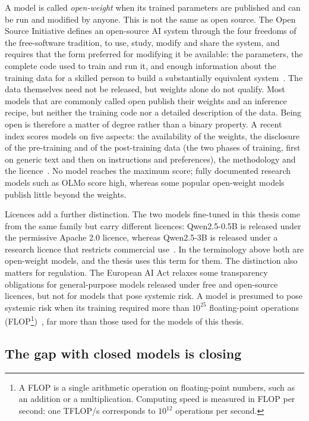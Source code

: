 A model is called \emph{open-weight} when its trained parameters are published and can be run and modified by anyone.
This is not the same as open source. The Open Source Initiative defines an open-source AI system through the four
freedoms of the free-software tradition, to use, study, modify and share the system, and requires that the form
preferred for modifying it be available: the parameters, the complete code used to train and run it, and enough
information about the training data for a skilled person to build a substantially equivalent system~\cite{osi2024osaid}.
The data themselves need not be released, but weights alone do not qualify. Most models that are commonly called open
publish their weights and an inference recipe, but neither the training code nor a detailed description of the data.
Being open is therefore a matter of degree rather than a binary property. A recent index scores models on five aspects: the
availability of the weights, the disclosure of the pre-training and of the post-training data (the two phases of
training, first on generic text and then on instructions and preferences), the methodology and the
licence~\cite{aa2025openness}. No model reaches the maximum score; fully documented research models such as OLMo score
high, whereas some popular open-weight models publish little beyond the weights.

Licences add a further distinction. The two models fine-tuned in this thesis come from the same family but carry
different licences: Qwen2.5-0.5B is released under the permissive Apache 2.0 licence, whereas Qwen2.5-3B is released
under a research licence that restricts commercial use~\cite{qwen2024qwen25}. In the terminology above both are
open-weight models, and the thesis uses this term for them. The distinction also matters for regulation. The European
AI Act relaxes some transparency obligations for general-purpose models released under free and open-source licences, but not
for models that pose systemic risk. A model is presumed to pose systemic risk when its training required more than
$10^{25}$ floating-point operations (FLOP\footnote{A FLOP is a single arithmetic operation on floating-point numbers,
such as an addition or a multiplication. Computing speed is measured in FLOP per second: one TFLOP/s corresponds to
$10^{12}$ operations per second.})~\cite{bommasani2024euaiact}, far more than those used for the models of this thesis.

\subsection{The gap with closed models is closing}
\label{sec:local-gap}


